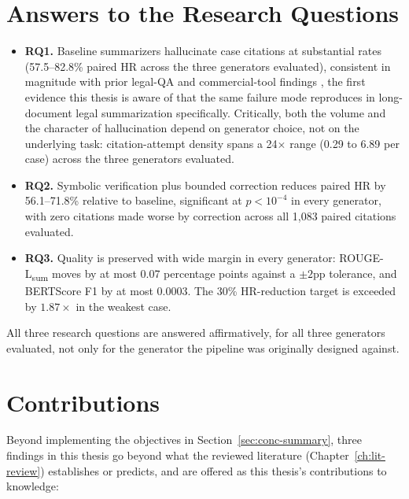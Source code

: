 \section{Answers to the Research Questions}
\label{sec:conc-rqs}

\begin{itemize}
  \item \textbf{RQ1.} Baseline summarizers hallucinate case citations at substantial rates (57.5--82.8\% paired HR across the three generators evaluated), consistent in magnitude with prior legal-QA and commercial-tool findings \cite{dahl2024largelegalfictions,magesh2025hallucinationfree}, the first evidence this thesis is aware of that the same failure mode reproduces in long-document legal summarization specifically. Critically, both the volume and the character of hallucination depend on generator choice, not on the underlying task: citation-attempt density spans a 24$\times$ range (0.29 to 6.89 per case) across the three generators evaluated.
  \item \textbf{RQ2.} Symbolic verification plus bounded correction reduces paired HR by 56.1--71.8\% relative to baseline, significant at $p<10^{-4}$ in every generator, with zero citations made worse by correction across all 1{,}083 paired citations evaluated.
  \item \textbf{RQ3.} Quality is preserved with wide margin in every generator: ROUGE-L\textsubscript{sum} moves by at most 0.07 percentage points against a $\pm2$pp tolerance, and BERTScore F1 by at most 0.0003. The 30\% HR-reduction target is exceeded by $1.87\times$ in the weakest case.
\end{itemize}

All three research questions are answered affirmatively, for all three generators evaluated, not only for the generator the pipeline was originally designed against.

\section{Contributions}
\label{sec:conc-contributions}

Beyond implementing the objectives in Section~\ref{sec:conc-summary}, three findings in this thesis go beyond what the reviewed literature (Chapter~\ref{ch:lit-review}) establishes or predicts, and are offered as this thesis's contributions to knowledge:

